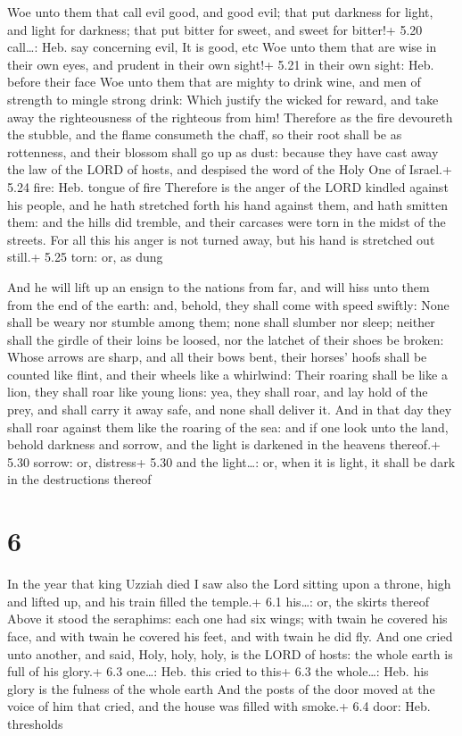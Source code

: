  Woe unto them that call evil good, and good evil; that
put darkness for light, and light for darkness; that put bitter for
sweet, and sweet for bitter!+ 5.20 call\ldots: Heb. say concerning evil,
It is good, etc  Woe unto them that are wise in their own
eyes, and prudent in their own sight!+ 5.21 in their own sight: Heb.
before their face  Woe unto them that are mighty to drink
wine, and men of strength to mingle strong drink:  Which
justify the wicked for reward, and take away the righteousness of the
righteous from him!  Therefore as the fire devoureth the
stubble, and the flame consumeth the chaff, so their root shall be as
rottenness, and their blossom shall go up as dust: because they have
cast away the law of the LORD of hosts, and despised the word of the
Holy One of Israel.+ 5.24 fire: Heb. tongue of fire 
Therefore is the anger of the LORD kindled against his people, and he
hath stretched forth his hand against them, and hath smitten them: and
the hills did tremble, and their carcases were torn in the midst of the
streets. For all this his anger is not turned away, but his hand is
stretched out still.+ 5.25 torn: or, as dung

 And he will lift up an ensign to the nations from far,
and will hiss unto them from the end of the earth: and, behold, they
shall come with speed swiftly:  None shall be weary nor
stumble among them; none shall slumber nor sleep; neither shall the
girdle of their loins be loosed, nor the latchet of their shoes be
broken:  Whose arrows are sharp, and all their bows bent,
their horses' hoofs shall be counted like flint, and their wheels like a
whirlwind:  Their roaring shall be like a lion, they shall
roar like young lions: yea, they shall roar, and lay hold of the prey,
and shall carry it away safe, and none shall deliver it. 
And in that day they shall roar against them like the roaring of the
sea: and if one look unto the land, behold darkness and sorrow, and the
light is darkened in the heavens thereof.+ 5.30 sorrow: or, distress+
5.30 and the light\ldots: or, when it is light, it shall be dark in the
destructions thereof

\hypertarget{section-5}{%
\section{6}\label{section-5}}

 In the year that king Uzziah died I saw also the Lord
sitting upon a throne, high and lifted up, and his train filled the
temple.+ 6.1 his\ldots: or, the skirts thereof  Above it
stood the seraphims: each one had six wings; with twain he covered his
face, and with twain he covered his feet, and with twain he did fly.
 And one cried unto another, and said, Holy, holy, holy, is
the LORD of hosts: the whole earth is full of his glory.+ 6.3 one\ldots:
Heb. this cried to this+ 6.3 the whole\ldots: Heb. his glory is the
fulness of the whole earth  And the posts of the door moved
at the voice of him that cried, and the house was filled with smoke.+
6.4 door: Heb. thresholds

